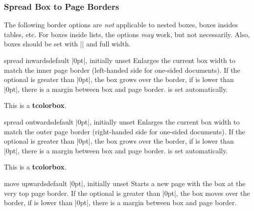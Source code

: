 \clearpage
\subsubsection{Spread Box to Page Borders}

\begin{marker}
The following border options are \emph{not} applicable to nested boxes, boxes insides
tables, etc.
For boxes inside lists, the options \emph{may} work, but not necessarily.
Also, boxes should be set with |\noindent| and full width.
\end{marker}

\begin{docTcbKey}[][doc new=2017-02-13]{spread inwards}{}{default |0pt|, initially unset}
Enlarges the current box width to match the inner page border (left-handed side for one-sided
documents). If the optional  is greater than |0pt|, the box
grows over the border, if  is lower than |0pt|, there is a
margin between box and page border.
 is set automatically.
\begin{dispListing}
\begin{tcolorbox}[enhanced,spread inwards,
  colframe=blue!75!black,colback=white,show bounding box]
This is a \textbf{tcolorbox}.
\end{tcolorbox}
\end{dispListing}
{\tcbusetemp}
\end{docTcbKey}

\begin{docTcbKey}[][doc new=2017-02-13]{spread outwards}{}{default |0pt|, initially unset}
Enlarges the current box width to match the outer page border (right-handed side for one-sided
documents). If the optional  is greater than |0pt|, the box
grows over the border, if  is lower than |0pt|, there is a
margin between box and page border.
 is set automatically.
\begin{dispListing}
\begin{tcolorbox}[enhanced,spread outwards,
  colframe=blue!75!black,colback=white,show bounding box]
This is a \textbf{tcolorbox}.
\end{tcolorbox}
\end{dispListing}
{\tcbusetemp}
\end{docTcbKey}


\begin{docTcbKey}[][doc new=2017-02-13]{move upwards}{}{default |0pt|, initially unset}
Starts a new page with the box at the very top page border.
If the optional  is greater than |0pt|, the box
moves over the border, if  is lower than |0pt|, there is a
margin between box and page border.
\end{docTcbKey}


